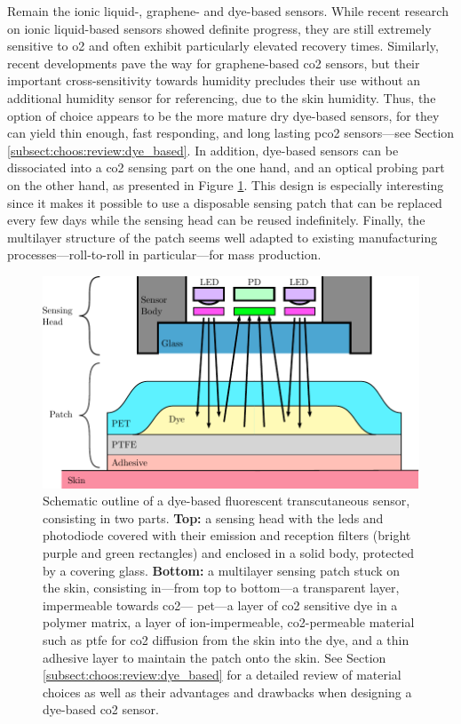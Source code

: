 Remain the ionic liquid-, graphene- and dye-based sensors. While recent research on ionic liquid-based sensors showed definite progress, they are still extremely sensitive to \gls{o2} and often exhibit particularly elevated recovery times\cite{willa2017, fapyane2020}. Similarly, recent developments pave the way for graphene-based \gls{co2} sensors\cite{akhter2021}, but their important cross-sensitivity towards humidity precludes their use without an additional humidity sensor for referencing, due to the skin humidity. Thus, the option of choice appears to be the more mature dry dye-based sensors, for they can yield thin enough, fast responding, and long lasting \gls{pco2} sensors---see Section \ref{subsect:choos:review:dye_based}. In addition, dye-based sensors can be dissociated into a \gls{co2} sensing part on the one hand, and an optical probing part on the other hand, as presented in Figure \ref{fig:choos:pot:fluo_patch}. This design is especially interesting since it makes it possible to use a disposable sensing patch that can be replaced every few days while the sensing head can be reused indefinitely. Finally, the multilayer structure of the patch seems well adapted to existing manufacturing processes---roll-to-roll in particular---for mass production\cite{briand2011, kostler2011}.

\begin{figure}
	\centering
	\includegraphics{1_main_matter/choos_figures/review/fluo_patch}
	\caption[Schematic outline of a dye-based fluorescent transcutaneous sensor, consisting in two parts.]{Schematic outline of a dye-based fluorescent transcutaneous sensor, consisting in two parts. \textbf{Top:} a sensing head with the \glspl{led} and photodiode covered with their emission and reception filters (bright purple and green rectangles) and enclosed in a solid body, protected by a covering glass. \textbf{Bottom:} a multilayer sensing patch stuck on the skin, consisting in---from top to bottom---a transparent layer, impermeable towards \gls{co2}---\eg{} \gls{pet}---a layer of \gls{co2} sensitive dye in a polymer matrix, a layer of ion-impermeable, \gls{co2}-permeable material such as \gls{ptfe} for \gls{co2} diffusion from the skin into the dye, and a thin adhesive layer to maintain the patch onto the skin. See Section \ref{subsect:choos:review:dye_based} for a detailed review of material choices as well as their advantages and drawbacks when designing a dye-based \gls{co2} sensor.}
	\label{fig:choos:pot:fluo_patch}
\end{figure}

